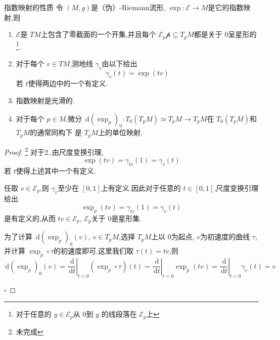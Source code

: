 \documentclass[../../几何与拓扑.tex]{subfiles}
\begin{document}
\begin{proposition}{指数映射的性质}
    令 \(  \left( M,g \right)   \)是（伪）-Riemann流形,  \(  \exp :\mathscr{E}\to M  \)是它的指数映射,则
    \begin{enumerate}
        \item \(  \mathscr{E}  \)是 \(  TM  \)上包含了零截面的一个开集,并且每个 \(\mathscr{E}_{p}  \mathscr{p}\subseteq T_{p}M  \)都是关于 \(  0  \)呈星形的\footnote{对于任意的 \(  y \in \mathscr{E}_{p} \)从 \(  0  \)到 \(  y  \) 的线段落在 \(  \mathscr{E}_{p}  \)上   }.    
        \item 对于每个 \(  v \in TM  \),测地线 \(   \gamma _{v}  \)由以下给出 \[
         \gamma _v\left( t \right)= \exp \left( tv \right)  
        \]  若 \(  t  \)使得两边中的一个有定义.  
        \item 指数映射是光滑的.
        \item 对于每个 \(  p \in M  \),微分 \(  \,\mathrm{d} \left( \exp _{p} \right)_{0}: T_0\left( T_{p}M \right)\simeq T_{p}M\to T_{p}M    \)在 \(  T_0\left( T_{p}M \right)   \)和\(  T_{p}M  \)的通常同构下  是 \(  T_{p}M  \)上的单位映射,   
    \end{enumerate}
\end{proposition}
\begin{proof}\footnote{未完成}
    对于2.,由尺度变换引理, \[
    \exp \left( tv \right)=  \gamma _{tv}\left( 1 \right)=  \gamma _{v}\left( t \right)   
    \]若 \(  t  \)使得上述其中一个有定义.
    
    任取 \(  v \in   \mathscr{E}_{p}\),则 \(   \gamma _{v}  \)至少在 \(  \left[ 0,1 \right]   \)上有定义.因此对于任意的 \(  t \in \left[ 0,1 \right]   \),尺度变换引理给出 \[
    \exp _{p}\left( tv \right)=  \gamma _{tv}\left( 1 \right)  =  \gamma _{v}\left( t \right) 
    \]    是有定义的,从而 \(  tv \in \mathscr{E}_{p}  \), \(  \mathscr{E}_{p}  \)关于 \(  0  \)是星形集.   

    为了计算 \(  \,\mathrm{d} \left( \exp _{p} \right)_{0}\left( v \right)    \), \(  v \in T_{p}M  \),选择 \(  T_{p}M  \)上以 \(  0  \)为起点, \(  v  \)为初速度的曲线 \(  \tau   \),并计算 \(  \exp _{p}\circ \tau   \)的初速度即可.这里我们取 \(  \tau \left( t \right)= tv   \),则 \[
    \,\mathrm{d} \left( \exp _{p} \right)_{0}\left( v \right)= \left. \frac{\,\mathrm{d}  }{\,\mathrm{d} t }  \right|_{t= 0}\left( \exp _{p}\circ \tau  \right)\left( t \right)=\left. \frac{\,\mathrm{d}  }{\,\mathrm{d} t }  \right|_{t= 0}\exp _{p}\left( tv \right)= \left. \frac{\,\mathrm{d}  }{\,\mathrm{d} t }  \right|_{t= 0} \gamma _{v}\left( t \right)= v       
    \]        

    \hfill $\square$
\end{proof}
\end{document}
